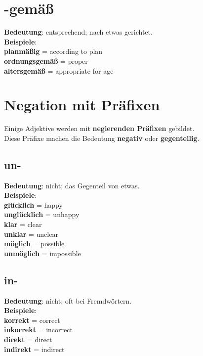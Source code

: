 \documentclass[a4paper]{article}
\begin{document}
    
    \section{-gem\"a\ss}
        \textbf{Bedeutung}: entsprechend; nach etwas gerichtet.\\
        \textbf{Beispiele}:\\
        \textbf{planm\"a\ss ig} = according to plan\\
        \textbf{ordnungsgem\"a\ss} = proper\\
        \textbf{altersgem\"a\ss} = appropriate for age\\
    
    
    \section{Negation mit Pr\"afixen}
        Einige Adjektive werden mit \textbf{negierenden Pr\"afixen} gebildet.\\
        Diese Pr\"afixe machen die Bedeutung \textbf{negativ} oder \textbf{gegenteilig}.\\
        
        \subsection{un-}
            \textbf{Bedeutung}: nicht; das Gegenteil von etwas.\\
            \textbf{Beispiele}:\\
            \textbf{gl\"ucklich} = happy\\
            \textbf{ungl\"ucklich} = unhappy\\
            \textbf{klar} = clear\\
            \textbf{unklar} = unclear\\
            \textbf{m\"oglich} = possible\\
            \textbf{unm\"oglich} = impossible\\
        
        \subsection{in-}
            \textbf{Bedeutung}: nicht; oft bei Fremdw\"ortern.\\
            \textbf{Beispiele}:\\
            \textbf{korrekt} = correct\\
            \textbf{inkorrekt} = incorrect\\
            \textbf{direkt} = direct\\
            \textbf{indirekt} = indirect\\
        
\end{document}
